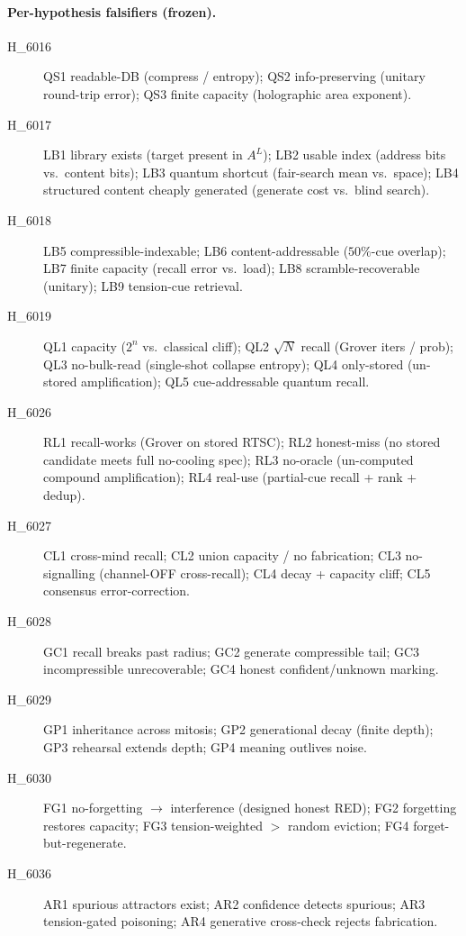 \documentclass[11pt,a4paper]{article}
\newcommand{\sqn}{\ensuremath{\sqrt{N}}}
\begin{document}
\paragraph{Per-hypothesis falsifiers (frozen).}
\begin{description}
  \item[H\_6016] QS1 readable-DB (compress / entropy); QS2 info-preserving
  (unitary round-trip error); QS3 finite capacity (holographic area exponent).
  \item[H\_6017] LB1 library exists (target present in $A^{L}$); LB2 usable index
  (address bits vs.\ content bits); LB3 quantum shortcut (fair-search mean vs.\
  space); LB4 structured content cheaply generated (generate cost vs.\ blind
  search).
  \item[H\_6018] LB5 compressible-indexable; LB6 content-addressable
  ($50\%$-cue overlap); LB7 finite capacity (recall error vs.\ load); LB8
  scramble-recoverable (unitary); LB9 tension-cue retrieval.
  \item[H\_6019] QL1 capacity ($2^{n}$ vs.\ classical cliff); QL2 \sqn{} recall
  (Grover iters / prob); QL3 no-bulk-read (single-shot collapse entropy); QL4
  only-stored (un-stored amplification); QL5 cue-addressable quantum recall.
  \item[H\_6026] RL1 recall-works (Grover on stored RTSC); RL2 honest-miss (no
  stored candidate meets full no-cooling spec); RL3 no-oracle (un-computed
  compound amplification); RL4 real-use (partial-cue recall + rank + dedup).
  \item[H\_6027] CL1 cross-mind recall; CL2 union capacity / no fabrication; CL3
  no-signalling (channel-OFF cross-recall); CL4 decay + capacity cliff; CL5
  consensus error-correction.
  \item[H\_6028] GC1 recall breaks past radius; GC2 generate compressible tail;
  GC3 incompressible unrecoverable; GC4 honest confident/unknown marking.
  \item[H\_6029] GP1 inheritance across mitosis; GP2 generational decay (finite
  depth); GP3 rehearsal extends depth; GP4 meaning outlives noise.
  \item[H\_6030] FG1 no-forgetting $\rightarrow$ interference (designed honest
  RED); FG2 forgetting restores capacity; FG3 tension-weighted $>$ random
  eviction; FG4 forget-but-regenerate.
  \item[H\_6036] AR1 spurious attractors exist; AR2 confidence detects spurious;
  AR3 tension-gated poisoning; AR4 generative cross-check rejects fabrication.
\end{description}
\end{document}
